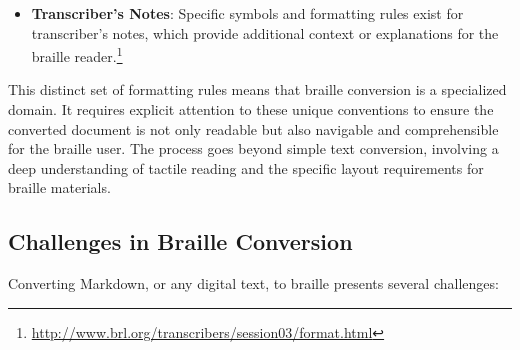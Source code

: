 \begin{itemize}[noitemsep,topsep=0pt]
    \item \textbf{Transcriber's Notes}: Specific symbols and formatting rules exist for transcriber's notes, which provide additional context or explanations for the braille reader.\footnote{\url{http://www.brl.org/transcribers/session03/format.html}}
\end{itemize}
This distinct set of formatting rules means that braille conversion is a specialized domain. It requires explicit attention to these unique conventions to ensure the converted document is not only readable but also navigable and comprehensible for the braille user. The process goes beyond simple text conversion, involving a deep understanding of tactile reading and the specific layout requirements for braille materials.

\subsection{Challenges in Braille Conversion}
Converting Markdown, or any digital text, to braille presents several challenges:
